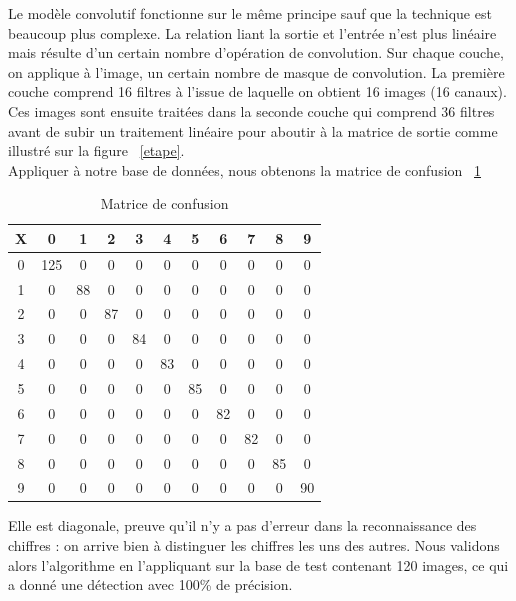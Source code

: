 \documentclass[12pt]{article}
\begin{document}
\noindent
Le modèle convolutif fonctionne sur le même principe sauf que la technique est beaucoup plus complexe. La relation liant la sortie et l'entrée n'est plus linéaire mais résulte d'un certain nombre d'opération de convolution. Sur chaque couche, on applique à l'image, un certain nombre de masque de convolution. La première couche comprend 16 filtres à l'issue de laquelle on obtient 16 images (16 canaux). Ces images sont ensuite traitées dans la seconde couche qui comprend 36 filtres  avant de subir un traitement linéaire pour aboutir à la matrice de sortie comme illustré sur la figure ~\ref{etape}.\\

Appliquer à notre base de données, nous obtenons la matrice de confusion ~\ref{tab3}
\begin{table}[!h]
\centering
	\begin{tabular}{|c|c|c|c|c|c|c|c|c|c|c|}
	    \hline
	     X& 0 & 1 & 2 & 3 & 4 & 5 & 6 &7 & 8 & 9\\
	    \hline
	    \hline
	    0 & 125 & 0 & 0 & 0 & 0 & 0 & 0 &0 & 0 & 0\\
	    \hline
	    1 & 0 & 88 & 0 & 0 & 0 & 0 & 0 &0& 0 & 0\\
	    \hline
	    2 & 0 & 0 & 87 & 0 & 0 & 0 & 0 & 0 & 0 & 0\\
	    \hline
	    3 & 0 & 0 & 0 & 84 & 0 & 0 & 0 & 0 & 0 & 0\\
	    \hline
	    4 & 0 & 0 & 0 & 0 & 83 & 0 & 0 &0& 0 & 0\\
	    \hline
	    5 & 0 & 0 & 0 & 0 & 0 & 85 & 0 &0 & 0 & 0\\
	    \hline
	    6 &0 & 0 & 0 & 0 & 0 & 0 & 82 &0 & 0 & 0\\
	    \hline
	    7 & 0 & 0 & 0 & 0 & 0 & 0 & 0 &82 & 0 & 0\\
	    \hline
	    8 & 0 & 0 & 0 & 0 & 0 & 0 & 0 &0 & 85 & 0\\
	    \hline
	    9 & 0 & 0 & 0 & 0 & 0 & 0 & 0 &0 & 0 & 90\\
	    \hline
	    
	\end{tabular}
     	\caption{\label{tab3} Matrice de confusion}
\end{table}
Elle est diagonale, preuve qu'il n'y a pas d'erreur dans la reconnaissance des chiffres : on arrive bien à distinguer les chiffres les uns des autres. Nous validons alors l'algorithme en l'appliquant sur la base de test contenant 120 images, ce qui a donné une détection avec 100\% de précision.
\end{document}
